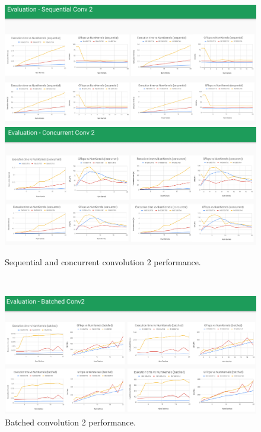 \documentclass[sigconf]{acmart}
\begin{document}
\newpage~\newpage
\begin{figure}[htb]
  \centering
  \includegraphics[width=\textwidth]{img/seq-conv2}
  \includegraphics[width=\textwidth]{img/conc-conv2}
  \caption{Sequential and concurrent convolution 2 performance.}
\end{figure}

\newpage~\newpage
\begin{figure}[htb]
  \centering
  \includegraphics[width=\textwidth]{img/batch-conv2}
  \caption{Batched convolution 2 performance.}
\end{figure}
\end{document}
